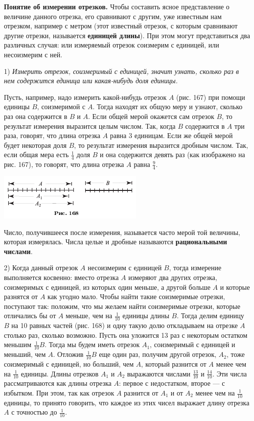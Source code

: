 \documentclass[oneside]{book}
\begin{document}
\textbf{Понятие об измерении отрезков.}
Чтобы составить ясное представление о величине данного отрезка, его сравнивают с другим, уже известным нам отрезком, например с метром (этот известный отрезок, с которым сравнивают другие отрезки, называется \textbf{единицей длины}).
При этом могут представиться два различных случая:
или измеряемый отрезок соизмерим с единицей, или несоизмерим с ней.

1) \emph{Измерить отрезок, соизмеримый с единицей, значит узнать, сколько раз в нем содержится единица или какая-нибудь доля единицы.}

Пусть, например, надо измерить какой-нибудь отрезок $A$ (рис. 167) при помощи единицы $B$, соизмеримой с $A$.
Тогда находят их общую меру и узнают, сколько раз она содержится в $B$ и $A$.
Если общей мерой окажется сам отрезок $B$, то результат измерения выразится целым числом.
Так, когда $B$ содержится в $A$ три раза, говорят, что длина отрезка $A$ равна 3 единицам.
Если же общей мерой будет некоторая доля $B$, то результат измерения выразится дробным числом.
Так, если общая мера есть $\tfrac14$ доля $B$ и она содержится девять раз (как изображено на рис. 167), то говорят, что длина отрезка $A$ равна $\tfrac94$.

\includegraphics{pics/ris-168}

Число, получившееся после измерения, называется часто мерой той величины, которая измерялась.
Числа целые и дробные называются \textbf{рациональными числами}.

2) Когда данный отрезок $A$ несоизмерим с единицей $B$, тогда измерение выполняется косвенно:
вместо отрезка $A$ измеряют два других отрезка, соизмеримых с единицей, из которых один меньше, а другой больше $A$ и которые разнятся от $A$ как угодно мало.
Чтобы найти такие соизмеримые отрезки, поступают так:
положим, что мы желаем найти соизмеримые отрезки, которые отличались бы от $A$ меньше, чем на
$\tfrac1{10}$ единицы длины $B$.
Тогда делим единицу $B$ на 10 равных частей (рис. 168) и одну такую долю откладываем на отрезке $A$ столько раз, сколько возможно.
Пусть она уложится 13 раз с некоторым остатком меньшим $\tfrac1{10}B$.
Тогда мы будем иметь отрезок $A_1$, соизмеримый с единицей и меньший, чем $A$.
Отложив $\tfrac1{10}B$ еще один раз, получим другой отрезок, $A_2$, тоже соизмеримый с единицей, но больший, чем $A$, который разнится от $A$ менее чем на $\tfrac1{10}$ единицы.
Длины отрезков $A_1$ и $A_2$ выражаются числами $\tfrac{13}{10}$ и $\tfrac{14}{10}$.
Эти числа рассматриваются как  длины отрезка $A$:
первое с недостатком, второе — с избытком.
При этом, так как отрезок $A$ разнится от $A_1$ и от $A_2$ менее чем на $\tfrac1{10}$ единицы, то принято говорить, что каждое из этих чисел выражает длину отрезка $A$ с точностью до $\tfrac1{10}$.
\end{document}
